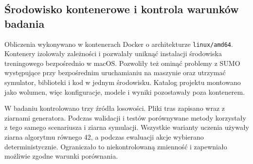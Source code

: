 \subsection{Środowisko kontenerowe i kontrola warunków badania}
\label{subsec:impl-konteneryzacja}

Obliczenia wykonywano w kontenerach Docker o architekturze \texttt{linux/amd64}. Kontenery izolowały zależności i pozwalały uniknąć instalacji środowiska treningowego bezpośrednio w macOS. Pozwoliły też ominąć problemy z SUMO występujące przy bezpośrednim uruchamianiu na maszynie oraz utrzymać symulator, biblioteki i kod w jednym środowisku. Katalog projektu montowano jako wolumen, więc konfiguracje, modele i wyniki pozostawały poza kontenerem.

W badaniu kontrolowano trzy źródła losowości. Pliki tras zapisano wraz z ziarnami generatora. Podczas walidacji i testów porównywane metody korzystały z tego samego scenariusza i ziarna symulacji. Wszystkie warianty uczenia używały ziarna algorytmu równego 42, a podczas ewaluacji akcje wybierano deterministycznie. Ograniczało to niekontrolowaną zmienność i zapewniało możliwie zgodne warunki porównania.
